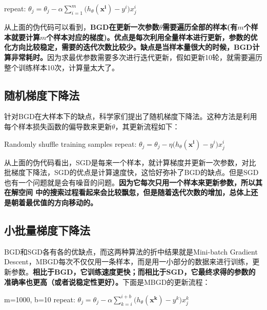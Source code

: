 \documentclass{article}
\begin{document}
	\begin{algorithmic}[1]
	\State repeat: 
		\State $\theta_j=\theta_j-\alpha\sum_{i=1}^m\big(h_\theta(\boldsymbol{x^i})-y^i\big)x^i_j$ 
	\EndFor
	\end{algorithmic}

	从上面的伪代码可以看到，\textbf{BGD在更新一次参数$\theta$需要遍历全部的样本(有$m$个样本就要计算$m$个样本对应的梯度)。优点是每次利用全量样本进行更新，参数的优化方向比较稳定，需要的迭代次数比较少。缺点是当样本量很大的时候，BGD计算非常耗时。}因为求最优参数需要多次进行迭代更新，假如更新10轮，就需要遍历整个训练样本10次，计算量太大了。

	\subsection{随机梯度下降法}
	针对BGD在大样本下的缺点，科学家们提出了随机梯度下降法。这种方法是利用每个样本损失函数的偏导数来更新$\theta$，其更新流程如下：

	\begin{algorithmic}[1]
	\State Randomly shuffle training samples
	\State repeat:
			\State $\theta_j=\theta_j-\eta\big(h_\theta(\boldsymbol{x^i})-y^i\big)x^i_j$ 
		\EndFor
	\EndFor
	\end{algorithmic}

	从上面的伪代码看出，SGD是每来一个样本，就计算梯度并更新一次参数，对比批梯度下降法，SGD的优点是计算速度快，这恰好弥补了BGD的缺点。但是SGD也有一个问题就是会有噪音的问题。\textbf{因为它每次只用一个样本来更新参数，所以其在解空间 中的搜索过程看起来会比较飘忽，但是随着迭代次数的增加，总体上还是朝着最优值的方向移动的。}

	\subsection{小批量梯度下降法}
	BGD和SGD各有各的优缺点，而这两种算法的折中结果就是Mini-batch Gradient Descent，MBGD每次不仅仅用一条样本，而是用一小部分的数据来进行训练，更新参数。\textbf{相比于BGD，它训练速度更快；而相比于SGD，它最终求得的参数的准确率也更高（或者说稳定性更好）。}下面是MBGD的更新流程：

	\begin{algorithmic}[1]
	\State m=1000, b=10 
	\State repeat:
			\State $\theta_j=\theta_j-\alpha\sum_{k=i}^{i+b}\big(h_\theta(\boldsymbol{x^k})-y^k\big)x^k_j$ 
		\EndFor
	\EndFor
	\end{algorithmic}
\end{document}
